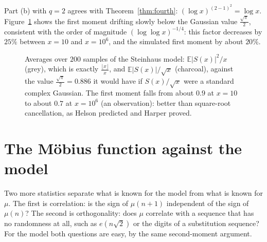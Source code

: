 Part (b) with $q=2$ agrees with Theorem~\ref{thm:fourth}: $(\log x)^{(2-1)^2}=\log x$. Figure~\ref{fig:firstmoment} shows the first moment drifting slowly below the Gaussian value $\frac{\sqrt\pi}2$, consistent with the order of magnitude $(\log\log x)^{-1/4}$: this factor decreases by $25\%$ between $x=10$ and $x=10^6$, and the simulated first moment by about $20\%$.

\begin{figure}[ht]
\centering{}
\caption{Averages over $200$ samples of the Steinhaus model: $\mathbb E|S(x)|^2/x$ (grey), which is exactly $\frac{\lfloor x\rfloor}x$, and $\mathbb E|S(x)|/\sqrt x$ (charcoal), against the value $\frac{\sqrt\pi}2=0.886$ it would have if $S(x)/\sqrt x$ were a standard complex Gaussian. The first moment falls from about $0.9$ at $x=10$ to about $0.7$ at $x=10^6$ (an observation): better than square-root cancellation, as Helson predicted and Harper proved.}
\label{fig:firstmoment}
\end{figure}

\section{The M\"obius function against the model}\label{sec:chowla}

Two more statistics separate what is known for the model from what is known for $\mu$. The first is correlation: is the sign of $\mu(n+1)$ independent of the sign of $\mu(n)$? The second is orthogonality: does $\mu$ correlate with a sequence that has no randomness at all, such as $e(n\sqrt2)$ or the digits of a substitution sequence? For the model both questions are easy, by the same second-moment argument.

